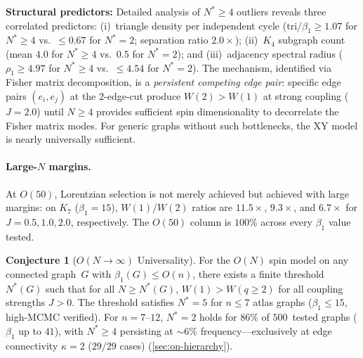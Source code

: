 \documentclass[11pt]{article}
\theoremstyle{definition}
\newtheorem{conjecture}[theorem]{Conjecture}
\theoremstyle{remark}
\begin{document}
\textbf{Structural predictors:}
Detailed analysis of $N^* \geq 4$ outliers reveals three correlated
predictors: (i)~triangle density per independent cycle
($\mathrm{tri}/\beta_1 \geq 1.07$ for $N^* \geq 4$ vs.\ $\leq 0.67$
for $N^* = 2$; separation ratio $2.0\times$); (ii)~$K_4$ subgraph count
(mean $4.0$ for $N^* \geq 4$ vs.\ $0.5$ for $N^* = 2$); and
(iii)~adjacency spectral radius ($\rho_1 \geq 4.97$ for $N^* \geq 4$
vs.\ $\leq 4.54$ for $N^* = 2$).  The mechanism, identified via
Fisher matrix decomposition, is a \emph{persistent competing edge pair}:
specific edge pairs $(e_i, e_j)$ at the $2$-edge-cut produce $W(2) > W(1)$
at strong coupling ($J = 2.0$) until $N \geq 4$ provides sufficient
spin dimensionality to decorrelate the Fisher matrix modes.
For generic graphs without such bottlenecks, the XY model is nearly
universally sufficient.

\paragraph{Large-$N$ margins.}
At $O(50)$, Lorentzian selection is not merely achieved but achieved with
large margins: on $K_7$ ($\beta_1 = 15$), $W(1)/W(2)$ ratios are
$11.5\times$, $9.3\times$, and $6.7\times$ for $J = 0.5, 1.0, 2.0$,
respectively. The $O(50)$ column is $100\%$ across every $\beta_1$ value tested.

\begin{conjecture}[$O(N \to \infty)$ Universality]
\label{conj:on-universality}
For the $O(N)$ spin model on any connected graph~$G$ with
$\beta_1(G) \leq O(n)$, there exists a
finite threshold $N^*(G)$ such that for all $N \geq N^*(G)$,
$W(1) > W(q \geq 2)$ for all coupling strengths $J > 0$.
The threshold satisfies $N^* = 5$ for $n \leq 7$ atlas graphs
($\beta_1 \leq 15$, high-MCMC verified).  For $n = 7$--$12$,
$N^* = 2$ holds for $86\%$ of $500$~tested graphs ($\beta_1$ up to $41$),
with $N^* \geq 4$ persisting at ${\sim}6\%$ frequency---exclusively
at edge connectivity $\kappa = 2$ ($29/29$ cases)
(\cref{sec:on-hierarchy}).
\end{conjecture}
\end{document}

